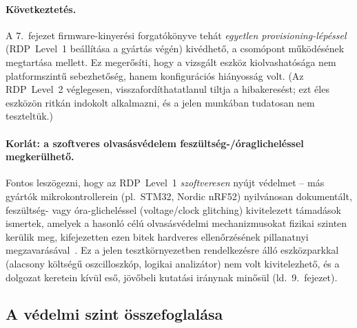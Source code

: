 \documentclass[12pt,a4paper]{article}
\begin{document}
\paragraph{Következtetés.} A 7.\ fejezet firmware-kinyerési forgatókönyve
tehát \emph{egyetlen provisioning-lépéssel} (RDP~Level~1 beállítása a
gyártás végén) kivédhető, a csomópont működésének megtartása mellett. Ez
megerősíti, hogy a vizsgált eszköz kiolvashatósága nem platformszintű
sebezhetőség, hanem konfigurációs hiányosság volt. (Az RDP~Level~2
véglegesen, visszafordíthatatlanul tiltja a hibakeresést; ezt éles
eszközön ritkán indokolt alkalmazni, és a jelen munkában tudatosan nem
teszteltük.)

\paragraph{Korlát: a szoftveres olvasásvédelem feszültség-/óraglicheléssel
megkerülhető.} Fontos leszögezni, hogy az RDP~Level~1 \emph{szoftveresen}
nyújt védelmet -- más gyártók mikrokontrollerein (pl.\ STM32, Nordic nRF52)
nyilvánosan dokumentált, feszültség- vagy óra-glicheléssel (voltage/clock
glitching) kivitelezett támadások ismertek, amelyek a hasonló célú
olvasásvédelmi mechanizmusokat fizikai szinten kerülik meg, kifejezetten
ezen bitek hardveres ellenőrzésének pillanatnyi megzavarásával~\cite{Kesenheimer2025,
Secure2025, Soler2025}. Ez a jelen tesztkörnyezetben rendelkezésre álló
eszközparkkal (alacsony költségű oszcilloszkóp, logikai analizátor) nem
volt kivitelezhető, és a dolgozat keretein kívül eső, jövőbeli kutatási
iránynak minősül (ld.\ 9.\ fejezet).

\subsection{A védelmi szint összefoglalása}
\end{document}
